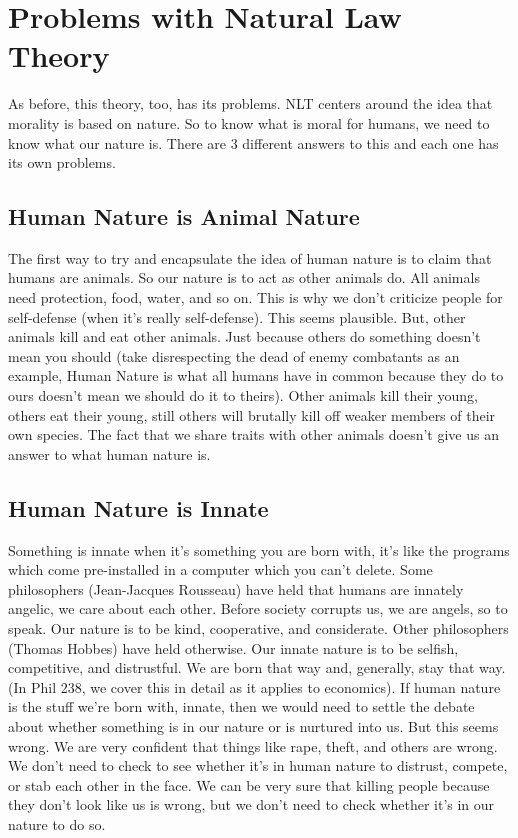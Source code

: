 \section{Problems with Natural Law Theory}

As before, this theory, too, has its problems. NLT centers around the idea that morality is based on nature. So to know what is moral for humans, we need to know what our nature is. There are 3 different answers to this and each one has its own problems.

\subsection{Human Nature is Animal Nature}

The first way to try and encapsulate the idea of human nature is to claim that humans are animals. So our nature is to act as other animals do. All animals need protection, food, water, and so on. This is why we don’t criticize people for self-defense (when it’s really self-defense). This seems plausible. But, other animals kill and eat other animals. Just because others do something doesn’t mean you should (take disrespecting the dead of enemy combatants as an example, Human Nature is what all humans have in common because they do to ours doesn’t mean we should do it to theirs). Other animals kill their young, others eat their young, still others will brutally kill off weaker members of their own species. The fact that we share traits with other animals doesn’t give us an answer to what human nature is.

\subsection{Human Nature is Innate}

Something is innate when it’s something you are born with, it’s like the programs which come pre-installed in a computer which you can’t delete. Some philosophers (Jean-Jacques Rousseau) have held that humans are innately angelic, we care about each other. Before society corrupts us, we are angels, so to speak. Our nature is to be kind, cooperative, and considerate. Other philosophers (Thomas Hobbes) have held otherwise. Our innate nature is to be selfish, competitive, and distrustful. We are born that way and, generally, stay that way. (In Phil 238, we cover this in detail as it applies to economics). If human nature is the stuff we’re born with, innate, then we would need to settle the debate about whether something is in our nature or is nurtured into us. But this seems wrong. We are very confident that things like rape, theft, and others are wrong. We don’t need to check to see whether it’s in human nature to distrust, compete, or stab each other in the face.  We can be very sure that killing people because they don’t look like us is wrong, but we don’t need to check whether it’s in our nature to do so.

